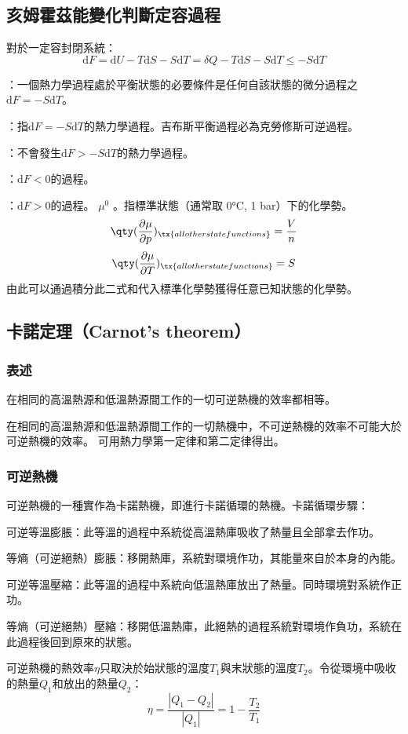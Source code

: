 \documentclass[a4paper,12pt]{report}
\begin{document}
\subsection{亥姆霍茲能變化判斷定容過程}
對於一定容封閉系統：
\[\mathrm{d} F = \mathrm{d} U - T \mathrm{d} S - S\mathrm{d} T = \delta Q - T \mathrm{d} S - S\mathrm{d} T\leq - S\mathrm{d} T\]
\bit
\item {}：一個熱力學過程處於平衡狀態的必要條件是任何自該狀態的微分過程之$\mathrm{d} F  = - S\mathrm{d} T$。
\item {}：指$\mathrm{d} F = - S\mathrm{d} T$的熱力學過程。吉布斯平衡過程必為克勞修斯可逆過程。
\item {}：不會發生$\mathrm{d} F > - S\mathrm{d} T$的熱力學過程。
\item {}：$\mathrm{d}F<0$的過程。
\item {}：$\mathrm{d}F>0$的過程。
\eit
{}
\(\mu^0\) 。指標準狀態（通常取 0°C, 1 bar）下的化學勢。
\[\qty(\frac{\partial\mu}{\partial p})_{\tx{all other state functions}}=\frac{V}{n}\]
\[\qty(\frac{\partial\mu}{\partial T})_{\tx{all other state functions}}=S\]
由此可以通過積分此二式和代入標準化學勢獲得任意已知狀態的化學勢。
\subsection{卡諾定理（Carnot's theorem）}
\subsubsection{表述}
\bit
\item 在相同的高溫熱源和低溫熱源間工作的一切可逆熱機的效率都相等。
\item 在相同的高溫熱源和低溫熱源間工作的一切熱機中，不可逆熱機的效率不可能大於可逆熱機的效率。
\eit
可用熱力學第一定律和第二定律得出。
\subsubsection{可逆熱機}
可逆熱機的一種實作為卡諾熱機，即進行卡諾循環的熱機。卡諾循環步驟：
\bit
\item 可逆等溫膨脹：此等溫的過程中系統從高溫熱庫吸收了熱量且全部拿去作功。
\item 等熵（可逆絕熱）膨脹：移開熱庫，系統對環境作功，其能量來自於本身的內能。
\item 可逆等溫壓縮：此等溫的過程中系統向低溫熱庫放出了熱量。同時環境對系統作正功。
\item 等熵（可逆絕熱）壓縮：移開低溫熱庫，此絕熱的過程系統對環境作負功，系統在此過程後回到原來的狀態。
\item 可逆熱機的熱效率$\eta$只取決於始狀態的溫度$T_1$與末狀態的溫度$T_2$。令從環境中吸收的熱量$Q_1$和放出的熱量$Q_2$：
\[\eta = \frac{\left|Q_1-Q_2\right|}{\left|Q_1\right|} = 1 - \frac{T_2}{T_1}\]
\eit
\end{document}
